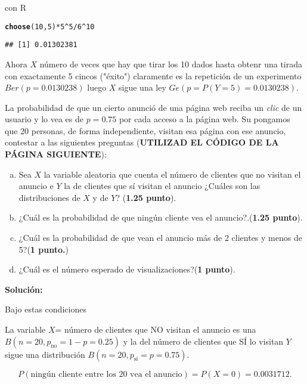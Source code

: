\documentclass[12pt]{article}\usepackage[]{graphicx}\usepackage[]{color}
\makeatletter
\newcommand{\hlnum}[1]{\textcolor[rgb]{0.686,0.059,0.569}{#1}}%
\newcommand{\hlopt}[1]{\textcolor[rgb]{0,0,0}{#1}}%
\newcommand{\hlstd}[1]{\textcolor[rgb]{0.345,0.345,0.345}{#1}}%
\newcommand{\hlkwd}[1]{\textcolor[rgb]{0.737,0.353,0.396}{\textbf{#1}}}%
\newenvironment{kframe}{%
 \def\at@end@of@kframe{}%
 \ifinner\ifhmode%
  \def\at@end@of@kframe{\end{minipage}}%
  \begin{minipage}{\columnwidth}%
 \fi\fi%
 \def\FrameCommand##1{\hskip\@totalleftmargin \hskip-\fboxsep
 \colorbox{shadecolor}{##1}\hskip-\fboxsep
     \hskip-\linewidth \hskip-\@totalleftmargin \hskip\columnwidth}%
 \MakeFramed {\advance\hsize-\width
   \@totalleftmargin\z@ \linewidth\hsize
   \@setminipage}}%
 {\par\unskip\endMakeFramed%
 \at@end@of@kframe}
\newenvironment{knitrout}{}{} %
\newcounter{problemes}
\newcounter{punts} \def\thepunts{\arabic{punts}}
\def\probl{\addtocounter{problemes}{1} \setcounter{punts}{0}
\medskip\noindent{\bf \theproblemes) }}
\makeatother
\begin{document}
con R
\begin{knitrout}
\color{fgcolor}\begin{kframe}
\begin{alltt}
\hlkwd{choose}\hlstd{(}\hlnum{10}\hlstd{,}\hlnum{5}\hlstd{)}\hlopt{*}\hlnum{5}\hlopt{^}\hlnum{5}\hlopt{/}\hlnum{6}\hlopt{^}\hlnum{10}
\end{alltt}
\begin{verbatim}
## [1] 0.01302381
\end{verbatim}
\end{kframe}
\end{knitrout}

Ahora $X$ número de veces que hay que tirar los 10 dados hasta obtenr una tirada con exactamente 5 cincos ("éxito")  claramente es la repetición de un experimento $Ber(p=0.0130238)$  luego $X$ sigue una ley $Ge(p=P(Y=5)=0.0130238).$



\probl La probabilidad de que un cierto anunció de una página web reciba un \textsl{clic}  de un usuario y lo vea  es de $p=0.75$ por cada acceso a la página web. Su pongamos que   20 personas, de forma independiente,  visitan esa página con ese anuncio,
contestar a las siguientes preguntas (\textbf{\textsc{UTILIZAD EL CÓDIGO DE LA PÁGINA SIGUIENTE}}):
\begin{enumerate}[a)]
\item Sea $X$ la variable aleatoria que cuenta el número de  clientes que no  visitan el anuncio  e $Y$ la de clientes que sí visitan el anuncio ¿Cuáles son las distribuciones de $X$ y  de $Y$? (\textbf{1.25 punto}).
\item ¿Cuál es la probabilidad de que ningún cliente vea el anuncio?.(\textbf{1.25 punto}).
\item ¿Cuál es la probabilidad de que vean el anuncio  más de 2 clientes  y menos de 5?(\textbf{1 punto.})
\item ¿Cuál es el número esperado de visualizaciones?(\textbf{1 punto}).
\end{enumerate}

\textbf{Solución:}

Bajo estas condiciones 

La variable $X$= número de clientes que NO visitan el anuncio es una $B(n=20,p_{\mbox{no}}=1-p=0.25)$ y la del número de clientes que SÍ lo visitan $Y$ sigue una distribución $B(n=20,p_{\mbox{sí}}=p=0.75)$.




$$P(\mbox{ningún cliente entre los 20 vea el anuncio})=P(X=0)=0.0031712.$$
\end{document}
